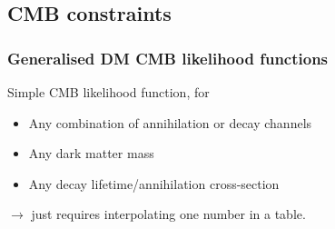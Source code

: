 \documentclass[xcolor=dvipsnames]{beamer}
\begin{document}
\subsection{CMB constraints}

\begin{frame}
\frametitle{Generalised DM CMB likelihood functions}

Simple CMB likelihood function, for
\begin{itemize}
\item Any combination of annihilation or decay channels
\item Any dark matter mass 
\item Any decay lifetime/annihilation cross-section
\end{itemize}
$\rightarrow$ just requires interpolating one number in a table.\vspace{5mm}





\end{frame}
\end{document}
